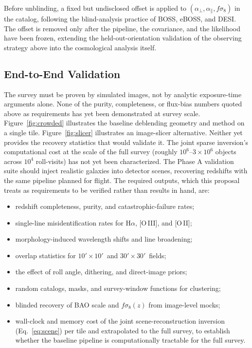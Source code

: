 \documentclass[10pt,onecolumn]{article}
\newcommand{\fsig}{f\sigma_8}
\newcommand{\fovsmall}{$10'\!\times10'$}
\newcommand{\fovlarge}{$30'\!\times30'$}
\begin{document}
Before unblinding, a fixed but undisclosed offset is applied to $(\alpha_\perp,\alpha_\parallel,\fsig)$ in the catalog, following the blind-analysis practice of BOSS, eBOSS, and DESI. The offset is removed only after the pipeline, the covariance, and the likelihood have been frozen, extending the held-out-orientation validation of the observing strategy above into the cosmological analysis itself.

\subsection{End-to-End Validation}\label{sec:e2eval}

The survey must be proven by simulated images, not by analytic exposure-time arguments alone. None of the purity, completeness, or flux-bias numbers quoted above as requirements has yet been demonstrated at survey scale. Figure~\ref{fig:crowded} illustrates the baseline deblending geometry and method on a single tile. Figure~\ref{fig:slicer} illustrates an image-slicer alternative. Neither yet provides the recovery statistics that would validate it. The joint sparse inversion's computational cost at the scale of the full survey (roughly $10^6$--$3\times10^6$ objects across $10^4$ roll-visits) has not yet been characterized. The Phase A validation suite should inject realistic galaxies into detector scenes, recovering redshifts with the same pipeline planned for flight. The required outputs, which this proposal treats as requirements to be verified rather than results in hand, are:
\begin{itemize}
  \item redshift completeness, purity, and catastrophic-failure rates;
  \item single-line misidentification rates for H$\alpha$, [O\,III], and [O\,II];
  \item morphology-induced wavelength shifts and line broadening;
  \item overlap statistics for \fovsmall\ and \fovlarge\ fields;
  \item the effect of roll angle, dithering, and direct-image priors;
  \item random catalogs, masks, and survey-window functions for clustering;
  \item blinded recovery of BAO scale and $\fsig(z)$ from image-level mocks;
  \item wall-clock and memory cost of the joint scene-reconstruction inversion (Eq.~\eqref{eq:scene}) per tile and extrapolated to the full survey, to establish whether the baseline pipeline is computationally tractable for the full survey.
\end{itemize}
\end{document}
